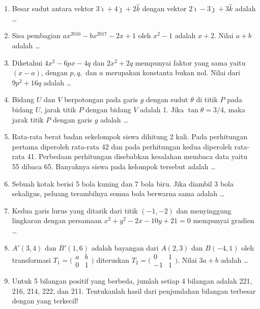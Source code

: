 \begin{enumerate}
\item Besar sudut antara vektor $3\hat{\imath} + 4\hat{\jmath} + 2\hat{k}$ dengan vektor $2\hat{\imath} - 3\hat{\jmath} + 3\hat{k}$ adalah \ldots

\item Sisa pembagian $ax^{2016} - bx^{2017} - 2x+1$ oleh $x^2-1$ adalah $x+2$. Nilai $a+b$ adalah \ldots

\item Diketahui $4x^2-6px-4q$ dan $2x^2+2q$ mempunyai faktor yang sama yaitu $(x-a)$, dengan $p,q,$ dan $a$ merupakan konstanta bukan nol. Nilai dari $9p^2 + 16q$ adalah \ldots

\item Bidang $U$ dan $V$ berpotongan pada garis $g$ dengan sudut $\theta$ di titik $P$ pada bidang $U$, jarak titik $P$ dengan bidang $V$ adalah 1. Jika $\tan \theta = 3/4$, maka jarak titik $P$ dengan garis $g$ adalah \ldots

\item Rata-rata berat badan sekelompok siswa dihitung 2 kali. Pada perhitungan pertama diperoleh rata-rata 42 dan pada perhitungan kedua diperoleh rata-rata 41. Perbedaan perhitungan disebabkan kesalahan membaca data yaitu 55 dibaca 65. Banyaknya siswa pada kelompok tersebut adalah \ldots

\item Sebuah kotak berisi 5 bola kuning dan 7 bola biru. Jika diambil 3 bola sekaligus, peluang terambilnya semua bola berwarna sama adalah \ldots

\item Kedua garis lurus yang ditarik dari titik $(-1,-2)$ dan menyinggung lingkaran dengan persamaan $x^2+y^2-2x-10y+21=0$ mempunyai gradien \ldots

\item $A'(3,4)$ dan $B'(1,6)$ adalah bayangan dari $A(2,3)$ dan $B(-4,1)$ oleh transformasi $T_1 = \bigl(\begin{smallmatrix} a & b\\ 0 & 1\end{smallmatrix}\bigr)$ diteruskan $T_2 = \bigl(\begin{smallmatrix} 0 & 1 \\ -1 & 1\end{smallmatrix}\bigr)$. Nilai $3a + b$ adalah \ldots

\item Untuk 5 bilangan positif yang berbeda, jumlah setiap 4 bilangan adalah 221, 216, 214, 222, dan 211. Tentukanlah hasil dari penjumlahan bilangan terbesar dengan yang terkecil!


\end{enumerate}
